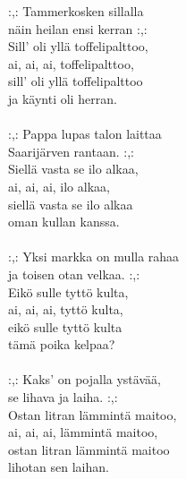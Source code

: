 
            :,: Tammerkosken sillalla \\
            näin heilan ensi kerran :,: \\
            Sill’ oli yllä toffelipalttoo, \\
            ai, ai, ai, toffelipalttoo, \\
            sill' oli yllä toffelipalttoo \\
            ja käynti oli herran. \\
\hspace{10mm} \\
            :,: Pappa lupas talon laittaa \\
            Saarijärven rantaan. :,: \\
            Siellä vasta se ilo alkaa, \\
            ai, ai, ai, ilo alkaa, \\
            siellä vasta se ilo alkaa \\
            oman kullan kanssa. \\
\hspace{10mm} \\
            :,: Yksi markka on mulla rahaa \\
            ja toisen otan velkaa. :,: \\
            Eikö sulle tyttö kulta, \\
            ai, ai, ai, tyttö kulta, \\
            eikö sulle tyttö kulta \\
            tämä poika kelpaa? \\
\hspace{10mm} \\
            :,: Kaks' on pojalla ystävää, \\
            se lihava ja laiha. :,: \\
            Ostan litran lämmintä maitoo, \\
            ai, ai, ai, lämmintä maitoo, \\
            ostan litran lämmintä maitoo \\
            lihotan sen laihan. \\
